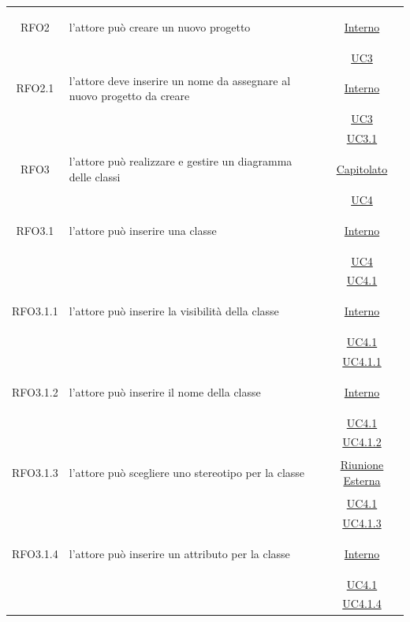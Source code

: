 \begin{itemize}
\begin{itemize}
\begin{itemize}
\begin{itemize}
\begin{longtable}{|c|>{\centering}m{7cm}|c|}
\hypertarget{RFO2}{RFO2} & l'attore può creare un nuovo progetto &  \hyperlink{Interno}{Interno}\\
& & \hyperref[UC3]{UC3}\\ \hline

\hypertarget{RFO2.1}{RFO2.1} & l'attore deve inserire un nome da assegnare al nuovo progetto da creare&  \hyperlink{Interno}{Interno}\\
& &\hyperref[UC3]{UC3}\\ 
& &\hyperref[UC3.1]{UC3.1}\\ \hline

\hypertarget{RFO3}{RFO3} & l'attore può realizzare e gestire un diagramma delle classi & \hyperlink{Capitolato}{Capitolato}\\
& & \hyperref[UC4]{UC4}\\ \hline

\hypertarget{RFO3.1}{RFO3.1} & l'attore può inserire una classe &  \hyperlink{Interno}{Interno}\\
& &\hyperref[UC4]{UC4}\\
& &\hyperref[UC4.1]{UC4.1}\\ \hline

\hypertarget{RFO3.1.1}{RFO3.1.1} & l'attore può inserire la visibilità della classe & \hyperlink{Interno}{Interno}\\
& &\hyperref[UC4.1]{UC4.1}\\
& &\hyperref[UC4.1.1]{UC4.1.1}\\ \hline

\hypertarget{RFO3.1.2}{RFO3.1.2} & l'attore può inserire il nome della classe & \hyperlink{Interno}{Interno}\\
& &\hyperref[UC4.1]{UC4.1}\\
& &\hyperref[UC4.1.2]{UC4.1.2}\\ \hline

\hypertarget{RFO3.1.3}{RFO3.1.3} & l'attore può scegliere uno stereotipo per la classe & \hyperlink{Riunione Esterna}{Riunione Esterna}\\
& &\hyperref[UC4.1]{UC4.1}\\
& &\hyperref[UC4.1.3]{UC4.1.3}\\ \hline

\hypertarget{RFO3.1.4}{RFO3.1.4} & l'attore può inserire un attributo per la classe & \hyperlink{Interno}{Interno}\\
& &\hyperref[UC4.1]{UC4.1}\\
& &\hyperref[UC4.1.4]{UC4.1.4}\\ \hline


\end{longtable}
\end{itemize}
\end{itemize}
\end{itemize}
\end{itemize}
